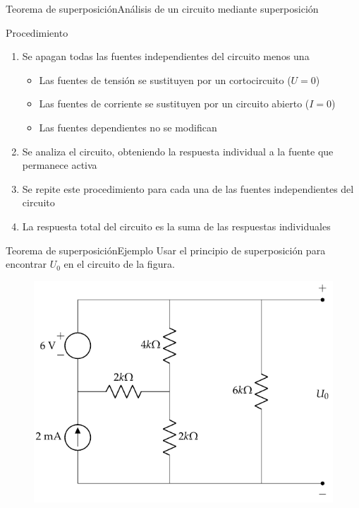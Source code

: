 \documentclass[aspectratio=169, xcolor={usenames,svgnames,dvipsnames}]{beamer}
\begin{document}
\begin{frame}{Teorema de superposición}{Análisis de un circuito mediante superposición}
\begin{block}{Procedimiento}
\begin{enumerate}
\item Se apagan todas las fuentes \alert{independientes} del circuito menos una
\begin{itemize}
\item Las fuentes de tensión se sustituyen por un cortocircuito (\(U = 0\))
\item Las fuentes de corriente se sustituyen por un circuito abierto (\(I = 0\))
\item Las fuentes {dependientes} {no} se modifican
\end{itemize}
\item Se analiza el circuito, obteniendo la respuesta individual a la fuente que permanece activa
\item Se repite este procedimiento para cada una de las fuentes \alert{independientes} del circuito
\item La respuesta total del circuito es la suma de las respuestas individuales
\end{enumerate}
\end{block}
\end{frame}

\begin{frame}{Teorema de superposición}{Ejemplo}
    Usar el principio de superposición para encontrar $U_0$ en el circuito de la figura.
    \begin{figure}[H]
        \centering
        \includegraphics[width=0.5\linewidth]{../figs/ej_superposicion_cc.pdf}
    \end{figure}
\end{frame}
\end{document}
